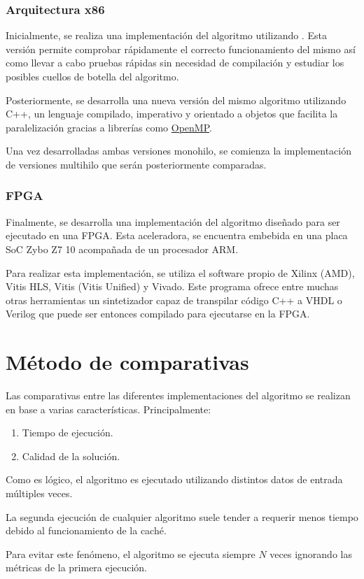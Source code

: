 \subsubsection{Arquitectura x86}

Inicialmente, se realiza una implementación del algoritmo utilizando \Python.
Esta versión permite comprobar rápidamente el correcto funcionamiento del mismo
así como llevar a cabo pruebas rápidas sin necesidad de compilación y
estudiar los posibles cuellos de botella del algoritmo.

Posteriormente, se desarrolla una nueva versión del mismo algoritmo
utilizando C++, un lenguaje compilado, imperativo y orientado a objetos
que facilita la paralelización gracias a librerías como 
\href{https://www.openmp.org/}{OpenMP}\@.

Una vez desarrolladas ambas versiones monohilo,
se comienza la implementación de versiones multihilo
que serán posteriormente comparadas.

\subsubsection{FPGA}

Finalmente, se desarrolla una implementación del algoritmo
diseñado para ser ejecutado en una FPGA\@.
Esta aceleradora, se encuentra embebida en una placa SoC
Zybo Z7 10 acompañada de un procesador ARM\@.

Para realizar esta implementación,
se utiliza el software propio de Xilinx (AMD),
Vitis HLS, Vitis (Vitis Unified) y Vivado\@.
Este programa ofrece entre muchas otras herramientas
un sintetizador capaz de transpilar código C++ a VHDL o Verilog
que puede ser entonces compilado
para ejecutarse en la FPGA\@.

\pagebreak
\section{Método de comparativas}

Las comparativas entre las diferentes implementaciones
del algoritmo se realizan en base a varias características.
Principalmente:

\begin{enumerate}[start=0, itemsep=0.25px]
    \item Tiempo de ejecución.
    \item Calidad de la solución.
\end{enumerate}

Como es lógico, el algoritmo es ejecutado utilizando
distintos datos de entrada múltiples veces.

\begin{notebox}
    La segunda ejecución de cualquier algoritmo suele tender a
    requerir menos tiempo debido al funcionamiento de la caché.
    
    Para evitar este fenómeno, el algoritmo se ejecuta
    siempre $N$ veces ignorando las métricas de la primera ejecución.
\end{notebox}

